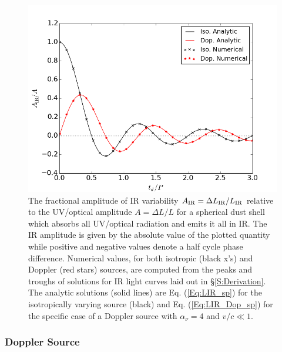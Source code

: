 \begin{figure}
\begin{center}
\includegraphics[scale=0.33]{figures/ch5/AIRplots/DopvsISO_AIRoAUV_alpha4_TsubCut1800_J1p5708_numin0_numx3_reclim50_TRHS2mx}
\end{center}
%
\caption{The fractional amplitude of IR variability $A_{\rm{IR}} = \Delta
L_{\rm{IR}}/L_{\rm{IR}}$ relative to the UV/optical amplitude $A=\Delta L/L$ for a
spherical dust shell which absorbs all UV/optical radiation and emits
it all in IR. The IR amplitude is given by the absolute value of the plotted
quantity while positive and negative values denote a half cycle phase
difference. Numerical values, for both isotropic (black x's) and
Doppler (red stars) sources, are computed from the peaks and troughs of
solutions for IR light curves laid out in \S \ref{S:Derivation}. The analytic
solutions (solid lines) are Eq. (\ref{Eq:LIR_sp}) for the isotropically varying
source (black) and Eq. (\ref{Eq:LIR_Dop_sp}) for the specific case of a
Doppler source with $\alpha_{\nu}=4$ and $v/c \ll 1$.} 
%
\label{Fig:AIRoAUV_sp}
\end{figure}



\subsubsection{Doppler Source} 

